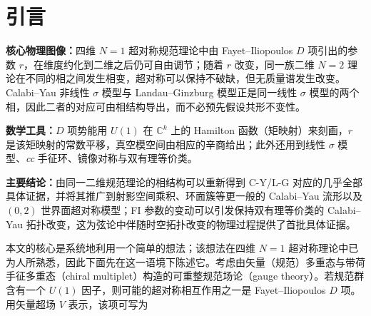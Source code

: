 
\label{op:2}

\section{引言}

\begin{keytakeaway}
\textbf{核心物理图像：}四维 $N=1$ 超对称规范理论中由 Fayet--Iliopoulos $D$ 项引出的参数 $r$，在维度约化到二维之后仍可自由调节；随着 $r$ 改变，同一族二维 $N=2$ 理论在不同的相之间发生相变，超对称可以保持不破缺，但无质量谱发生改变。Calabi--Yau 非线性 $\sigma$ 模型与 Landau--Ginzburg 模型正是同一线性 $\sigma$ 模型的两个相，因此二者的对应可由相结构导出，而不必预先假设共形不变性。

\par\textbf{数学工具：}$D$ 项势能用 $U(1)$ 在 $\mathbb{C}^k$ 上的 Hamilton 函数（矩映射）来刻画，$r$ 是该矩映射的常数平移，真空模空间由相应的辛商给出；此外还用到线性 $\sigma$ 模型、\textit{cc} 手征环、镜像对称与双有理等价类。

\par\textbf{主要结论：}由同一二维规范理论的相结构可以重新得到 C-Y/L-G 对应的几乎全部具体证据，并将其推广到射影空间乘积、环面簇等更一般的 Calabi--Yau 流形以及 $(0,2)$ 世界面超对称模型；FI 参数的变动可以引发保持双有理等价类的 Calabi--Yau 拓扑改变，这为弦论中伴随时空拓扑改变的物理过程提供了首批具体证据。
\end{keytakeaway}

本文的核心是系统地利用一个简单的想法；该想法在四维 $N=1$ 超对称理论中已为人所熟悉，因此下面先在这一语境下陈述它。考虑由矢量（规范）多重态与带荷手征多重态（chiral multiplet）构造的可重整规范场论（gauge theory）。若规范群含有一个 $U(1)$ 因子，则可能的超对称相互作用之一是 Fayet--Iliopoulos $D$ 项。用矢量超场 $V$ 表示，该项可写为


